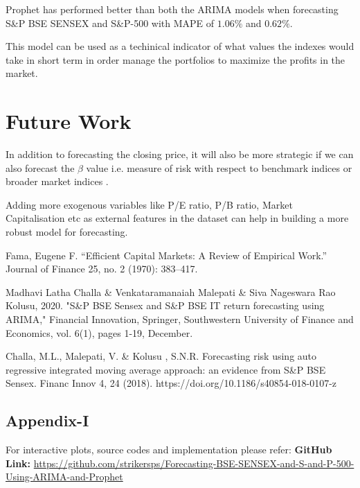 \documentclass[conference]{IEEEtran}
\begin{document}
Prophet has performed better than both the ARIMA models when forecasting S\&P BSE SENSEX and S\&P-500 with MAPE of $1.06\%$ and $0.62\%$.

This model can be used as a techinical indicator of what values the indexes would take in short term in order manage the portfolios to maximize the profits in the market.

\section{Future Work}
In addition to forecasting the closing price, it will also be more strategic if we can also forecast the $\beta$ value i.e. measure of risk with respect to benchmark indices or broader market indices \cite{b3}.

Adding more exogenous variables like P/E ratio, P/B ratio, Market Capitalisation etc as external features in the dataset can help in building a more robust model for forecasting.

\begin{thebibliography}{00}
	 Fama, Eugene F. “Efficient Capital Markets: A Review of Empirical Work.” Journal of Finance 25, no. 2 (1970): 383–417.
	
	 Madhavi Latha Challa \& Venkataramanaiah Malepati \& Siva Nageswara Rao Kolusu, 2020. "S\&P BSE Sensex and S\&P BSE IT return forecasting using ARIMA," Financial Innovation, Springer, Southwestern University of Finance and Economics, vol. 6(1), pages 1-19, December.
	
	 Challa, M.L., Malepati, V. \& Kolusu , S.N.R. Forecasting risk using auto regressive integrated moving average approach: an evidence from S\&P BSE Sensex. Financ Innov 4, 24 (2018). https://doi.org/10.1186/s40854-018-0107-z
\end{thebibliography}

\appendix
\subsection{Appendix-I}
For interactive plots, source codes and implementation please refer:\newline
\textbf{GitHub Link:} \href{https://github.com/strikersps/Forecasting-BSE-SENSEX-and-S-and-P-500-Using-ARIMA-and-Prophet}{https://github.com/strikersps/Forecasting-BSE-SENSEX-and-S-and-P-500-Using-ARIMA-and-Prophet} \newline
\end{document}
